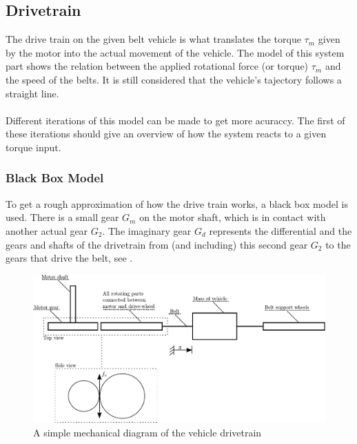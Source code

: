 \subsection{Drivetrain}\label{Drivetrain}

The drive train on the given belt vehicle is what translates the torque $\tau_m$ given by the motor into the actual movement of the vehicle. The model of this system part shows the relation between the applied rotational force (or torque) $\tau_m$ and the speed of the belts. It is still considered that the vehicle's tajectory follows a straight line.\\\\
%
Different iterations of this model can be made to get more acuraccy. The first of these iterations should give an overview of how the system reacts to a given torque input. 

\subsubsection{Black Box Model}\label{BlackBoxModel}
To get a rough approximation of how the drive train works, a black box model is used. There is a small gear $G_m$ on the motor shaft, which is in contact with another actual gear $G_2$. The imaginary gear $G_d$ represents the differential and the gears and shafts of the drivetrain from (and including) this second gear $G_2$ to the gears that drive the belt, see .

\begin{figure}[H]
	\centering
	\includegraphics[scale=0.8]{figures/mechanicalDrawing.pdf}
	\caption{A simple mechanical diagram of the vehicle drivetrain}
	\label{fig:DrivetrainMechanicalModel}
\end{figure}

